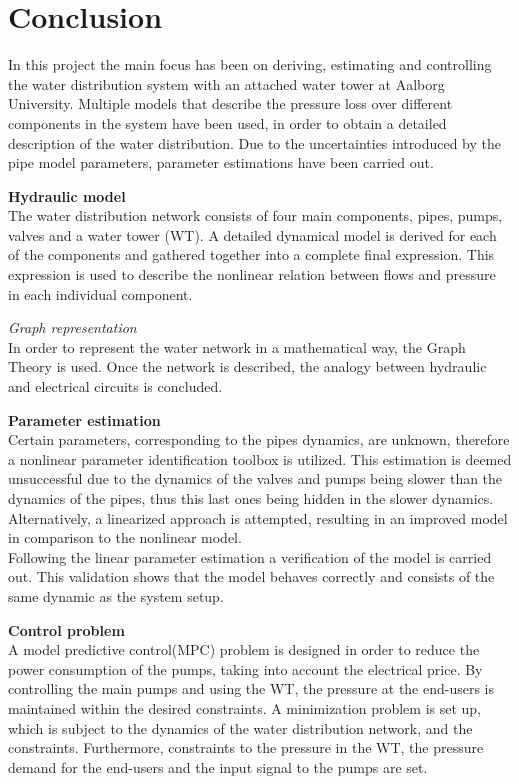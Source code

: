 \chapter{Conclusion}
\label{Conclusion}

In this project the main focus has been on deriving, estimating and controlling the water distribution system with an attached water tower at Aalborg University. Multiple models that describe the pressure loss over different components in the system have been used, in order to obtain a detailed description of the water distribution. Due to the uncertainties introduced by the pipe model parameters, parameter estimations have been carried out. 

\textbf{Hydraulic model}\\
The water distribution network consists of four main components, pipes, pumps, valves and a  water tower (WT). A detailed dynamical model is derived for each of the components and gathered together into a complete final expression. This expression is used to describe the nonlinear relation between flows and pressure in each individual component.

\textit{Graph representation}\\
In order to represent the water network in a mathematical way, the Graph Theory is used. Once the network is described, the analogy between hydraulic and electrical circuits is concluded. 

\textbf{Parameter estimation}\\
Certain parameters, corresponding to the pipes dynamics, are unknown, therefore a nonlinear parameter identification toolbox is utilized. This estimation is deemed unsuccessful due to the dynamics of the valves and pumps being slower than the dynamics of the pipes, thus this last ones being hidden in the slower dynamics.\\
Alternatively, a linearized approach is attempted, resulting in an improved model in comparison to the nonlinear model.\\
Following the linear parameter estimation a verification of the model is carried out. This validation shows that the model behaves correctly and consists of the same dynamic as the system setup.  

\textbf{Control problem}\\
A model predictive control(MPC) problem is designed in order to reduce the power consumption of the pumps, taking into account the electrical price. By controlling the main pumps and using the WT, the pressure at the end-users is maintained within the desired constraints. A minimization problem is set up, which is subject to the dynamics of the water distribution network, and the constraints. Furthermore, constraints to the pressure in the WT, the pressure demand for the end-users and the input signal to the pumps are set.

